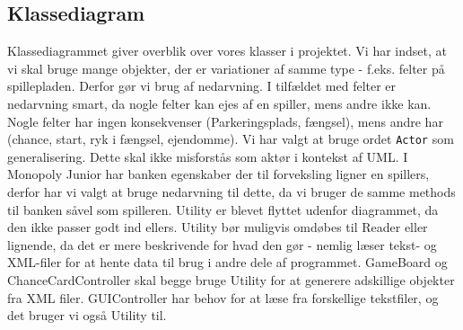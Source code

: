 \subsection{Klassediagram}
Klassediagrammet giver overblik over vores klasser i projektet. Vi har indset, at vi skal bruge mange objekter, der er variationer af samme type - f.eks. felter på spillepladen. Derfor gør vi brug af nedarvning. I tilfældet med felter er nedarvning smart, da nogle felter kan ejes af en spiller, mens andre ikke kan. Nogle felter har ingen konsekvenser (Parkeringsplads, fængsel), mens andre har (chance, start, ryk i fængsel, ejendomme).
Vi har valgt at bruge ordet \texttt{Actor} som generalisering. Dette skal ikke misforstås som aktør i kontekst af UML. I Monopoly Junior har banken egenskaber der til forveksling ligner en spillers, derfor har vi valgt at bruge nedarvning til dette, da vi bruger de samme methods til banken såvel som spilleren.
Utility er blevet flyttet udenfor diagrammet, da den ikke passer godt ind ellers. Utility bør muligvis omdøbes til Reader eller lignende, da det er mere beskrivende for hvad den gør - nemlig læser tekst- og XML-filer for at hente data til brug i andre dele af programmet. GameBoard og ChanceCardController skal begge bruge Utility for at generere adskillige objekter fra XML filer. GUIController har behov for at læse fra forskellige tekstfiler, og det bruger vi også Utility til.
